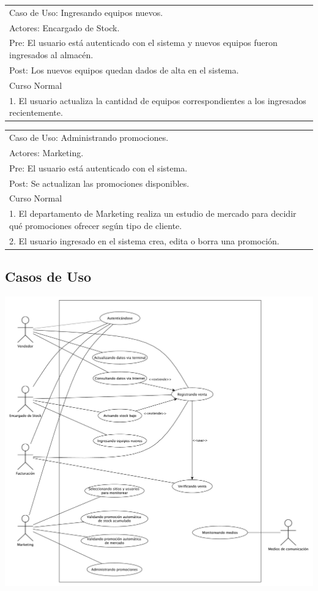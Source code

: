 \vspace{1cm}

\begin{tabular}{ | p{14cm} | }
  \hline
  Caso de Uso: Ingresando equipos nuevos. \\
  Actores: Encargado de Stock. \\
  Pre: El usuario está autenticado con el sistema y nuevos equipos fueron ingresados al almacén. \\
  Post: Los nuevos equipos quedan dados de alta en el sistema. \\
  \hline
  Curso Normal\\
  \hline
  1. El usuario actualiza la cantidad de equipos correspondientes a los ingresados recientemente. \\
  \hline
\end{tabular}

\vspace{1cm}

\begin{tabular}{ | p{14cm} | }
  \hline
  Caso de Uso: Administrando promociones. \\
  Actores: Marketing. \\
  Pre: El usuario está autenticado con el sistema. \\
  Post: Se actualizan las promociones disponibles. \\
  \hline
  Curso Normal\\
  \hline
  1. El departamento de Marketing realiza un estudio de mercado para decidir qué promociones ofrecer según tipo de cliente. \\
  2. El usuario ingresado en el sistema crea, edita o borra una promoción. \\
  \hline
\end{tabular}

\subsection{Casos de Uso}

\includegraphics[width=1.1\textwidth]{./imagenes/casos_de_uso.pdf}

